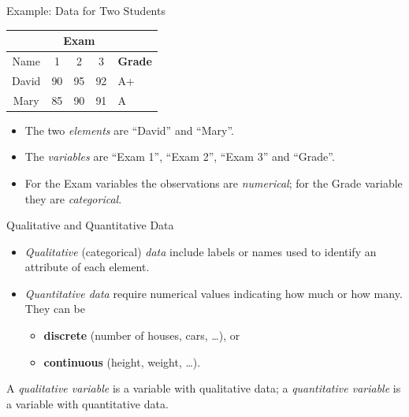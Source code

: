 \documentclass[10pt,aspectratio=169]{beamer}
\begin{document}
\begin{frame}{Example: Data for Two Students}
  \begin{center}
    \begin{tabular}{|c|ccc|l|}
      \hline
              & \multicolumn{3}{c|}{Exam} &                 \\ \hline
      Name    & 1  & 2  & 3  & \textbf{Grade}               \\ \hline
      David   & 90 & 95 & 92 & A+                           \\
      Mary    & 85 & 90 & 91 & A                            \\ \hline
    \end{tabular}
  \end{center}

  \vspace{0.8em}
  \begin{itemize}
    \item The two \emph{elements} are ``David'' and ``Mary''.
    \item The \emph{variables} are ``Exam 1'', ``Exam 2'', ``Exam 3'' and
          ``Grade''.
    \item For the Exam variables the observations are \emph{numerical}; for the
          Grade variable they are \emph{categorical}.
  \end{itemize}
\end{frame}

\begin{frame}{Qualitative and Quantitative Data}
  \begin{itemize}
    \item \emph{Qualitative} (categorical) \emph{data} include labels or names
          used to identify an attribute of each element.
    \item \emph{Quantitative data} require numerical values indicating how much
          or how many. They can be
          \begin{itemize}
            \item \textbf{discrete} (number of houses, cars, \dots), or
            \item \textbf{continuous} (height, weight, \dots).
          \end{itemize}
  \end{itemize}

  \vspace{0.6em}
  A \emph{qualitative variable} is a variable with qualitative data; a
  \emph{quantitative variable} is a variable with quantitative data.
\end{frame}
\end{document}
